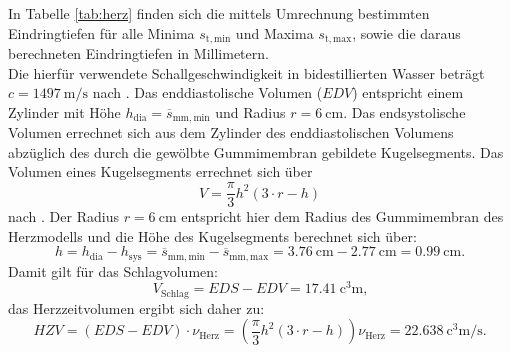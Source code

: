In Tabelle \ref{tab:herz} finden sich die mittels Umrechnung bestimmten Eindringtiefen für alle Minima $s_\mathrm{t,min}$ und Maxima $s_\mathrm{t,max}$, sowie die daraus berechneten Eindringtiefen in Millimetern.\\
Die hierfür verwendete Schallgeschwindigkeit in bidestillierten Wasser beträgt $c=\SI{1497}{\meter\per\second}$ nach \cite{schall}.
Das enddiastolische Volumen ($EDV$) entspricht einem Zylinder mit Höhe $h_\mathrm{dia}=\overline{s}_\mathrm{mm,min}$ und Radius $r=\SI{6}{\centi\meter}$.
Das endsystolische Volumen errechnet sich aus dem Zylinder des enddiastolischen Volumens abzüglich des durch die gewölbte Gummimembran gebildete Kugelsegments. Das Volumen eines Kugelsegments errechnet sich über
\begin{equation}
  V=\frac{\pi}{3}h^2\left (3 \cdot r - h\right)
\end{equation}
nach \cite{bronstein}.
Der Radius $r=\SI{6}{\centi\meter}$ entspricht hier dem Radius des Gummimembran des Herzmodells und die Höhe des Kugelsegments berechnet sich über:
\begin{equation*}
  h=h_\mathrm{dia}-h_\mathrm{sys}=\overline{s}_\mathrm{mm,min}-\overline{s}_\mathrm{mm,max}=\SI{3.76}{\centi\meter}-\SI{2.77}{\centi\meter}=\SI{0.99}{\centi\meter}
\text{.}
\end{equation*}
Damit gilt für das Schlagvolumen:
\begin{equation*}
  V_\mathrm{Schlag}=EDS-EDV=\SI{17.41}{\cubic\centi\meter}\text{,}
\end{equation*}
das Herzzeitvolumen ergibt sich daher zu:
\begin{equation*}
  HZV=\left(EDS-EDV\right)\cdot \nu_\mathrm{Herz}=\left(\frac{\pi}{3}h^2\left (3 \cdot r - h\right) \right) \nu_\mathrm{Herz}=\SI{22.638}{\cubic\centi\meter\per\second}\text{.}
\end{equation*}




